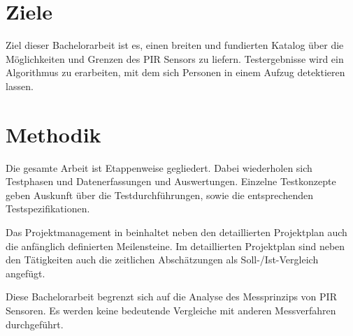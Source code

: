 \section{Ziele}
\label{sec:Einleitung}
Ziel dieser Bachelorarbeit ist es, einen breiten und fundierten Katalog über die Möglichkeiten und Grenzen des PIR Sensors zu liefern. Testergebnisse wird ein Algorithmus zu erarbeiten, mit dem sich Personen in einem Aufzug detektieren lassen. 

\section{Methodik}
\label{sec:Methodik}
Die gesamte Arbeit ist Etappenweise gegliedert. Dabei wiederholen sich Testphasen und Datenerfassungen und Auswertungen. Einzelne Testkonzepte geben Auskunft über die Testdurchführungen, sowie die entsprechenden Testspezifikationen. 

Das Projektmanagement in  beinhaltet neben den detaillierten Projektplan auch die anfänglich definierten Meilensteine. Im detaillierten Projektplan sind neben den Tätigkeiten auch die zeitlichen Abschätzungen als Soll-/Ist-Vergleich angefügt. 


Diese Bachelorarbeit begrenzt sich auf die Analyse des Messprinzips von PIR Sensoren. Es werden keine bedeutende Vergleiche mit anderen Messverfahren durchgeführt. 